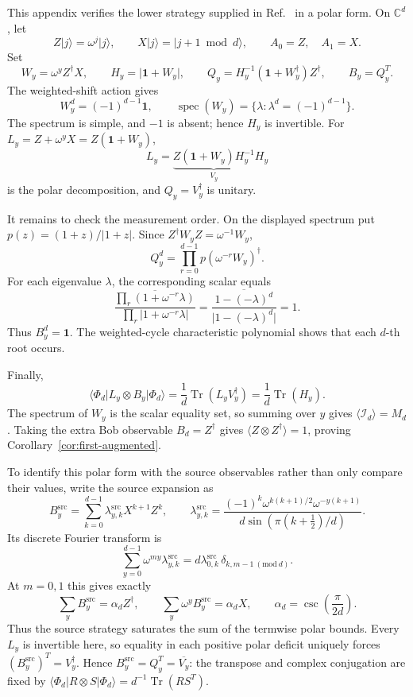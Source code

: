 \documentclass[11pt]{article}
\theoremstyle{definition}
\theoremstyle{remark}
\newcommand{\Id}{\mathbf 1}
\newcommand{\cI}{\mathcal I}
\newcommand{\Tr}{\operatorname{Tr}}
\newcommand{\spec}{\operatorname{spec}}
\newcommand{\bbC}{\mathbb C}
\newcommand{\absop}[1]{\lvert #1\rvert}
\begin{document}
This appendix verifies the lower strategy supplied in
Ref.~\cite{PeritoEtAl2026} in a polar form.  On \(\bbC^d\), let
\[
 Z\lvert j\rangle=\omega^j\lvert j\rangle,
 \qquad X\lvert j\rangle=\lvert j+1\bmod d\rangle,
 \qquad A_0=Z,\quad A_1=X.
\]
Set
\[
 W_y=\omega^yZ^\dagger X,
 \qquad H_y=\absop{\Id+W_y},
 \qquad
 Q_y=H_y^{-1}(\Id+W_y^\dagger)Z^\dagger,
 \qquad B_y=Q_y^T.
\]
The weighted-shift action gives
\[
 W_y^d=(-1)^{d-1}\Id,
 \qquad
 \spec(W_y)=\{\lambda:\lambda^d=(-1)^{d-1}\}.
\]
The spectrum is simple, and \(-1\) is absent; hence \(H_y\) is invertible.
For \(L_y=Z+\omega^yX=Z(\Id+W_y)\),
\[
 L_y=\underbrace{Z(\Id+W_y)H_y^{-1}}_{V_y}H_y
\]
is the polar decomposition, and \(Q_y=V_y^\dagger\) is unitary.

It remains to check the measurement order.  On the displayed spectrum put
\(p(z)=(1+z)/\absop{1+z}\).  Since
\(Z^\dagger W_yZ=\omega^{-1}W_y\),
\[
 Q_y^d=\prod_{r=0}^{d-1}p(\omega^{-r}W_y)^\dagger.
\]
For each eigenvalue \(\lambda\), the corresponding scalar equals
\[
 \overline{\frac{\prod_r(1+\omega^{-r}\lambda)}
 {\prod_r\absop{1+\omega^{-r}\lambda}}}
 =\overline{\frac{1-(-\lambda)^d}{\absop{1-(-\lambda)^d}}}=1.
\]
Thus \(B_y^d=\Id\).  The weighted-cycle characteristic polynomial shows
that each \(d\)-th root occurs.

Finally,
\[
 \langle\Phi_d\vert L_y\otimes B_y\vert\Phi_d\rangle
 =\frac1d\Tr(L_yV_y^\dagger)=\frac1d\Tr(H_y).
\]
The spectrum of \(W_y\) is the scalar equality set, so summing over \(y\)
gives \(\langle\cI_d\rangle=M_d\).  Taking the extra Bob observable
\(B_d=Z^\dagger\) gives \(\langle Z\otimes Z^\dagger\rangle=1\), proving
Corollary~\ref{cor:first-augmented}.

To identify this polar form with the source observables rather than only
compare their values, write the source expansion as
\[
 B_y^{\mathrm{src}}=\sum_{k=0}^{d-1}\lambda^{\mathrm{src}}_{y,k}
 X^{k+1}Z^k,
 \qquad
 \lambda^{\mathrm{src}}_{y,k}=
 \frac{(-1)^k\omega^{k(k+1)/2}\omega^{-y(k+1)}}
 {d\sin(\pi(k+\tfrac12)/d)}.
\]
Its discrete Fourier transform is
\[
 \sum_{y=0}^{d-1}\omega^{my}\lambda^{\mathrm{src}}_{y,k}
 =d\lambda^{\mathrm{src}}_{0,k}\,
 \delta_{k,m-1\ (\mathrm{mod}\ d)}.
\]
At \(m=0,1\) this gives exactly
\begin{equation}
 \sum_yB_y^{\mathrm{src}}=\alpha_dZ^\dagger,
 \qquad
 \sum_y\omega^yB_y^{\mathrm{src}}=\alpha_dX,
 \qquad
 \alpha_d=\csc\!\left(\frac{\pi}{2d}\right).
 \label{eq:source-fourier}
\end{equation}
Thus the source strategy saturates the sum of the termwise polar bounds.
Every \(L_y\) is invertible here, so equality in each positive polar deficit
uniquely forces \((B_y^{\mathrm{src}})^T=V_y^\dagger\).  Hence
\(B_y^{\mathrm{src}}=Q_y^T=\overline{V_y}\): the transpose and complex
conjugation are fixed by
\(\langle\Phi_d|R\otimes S|\Phi_d\rangle=d^{-1}\Tr(RS^T)\).
\end{document}

